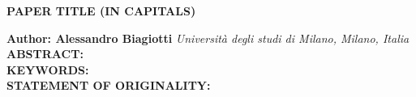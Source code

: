 \documentclass[a4paper,10pt]{article}
\begin{document}
\noindent 
\begin{center}
\textbf{{\Large PAPER TITLE (IN CAPITALS)}} \\
\end{center}

\noindent 
\textbf{Author: Alessandro Biagiotti} \textit{Università degli studi di Milano, Milano, Italia}
\\


\noindent 
\textbf{ABSTRACT:}
\\

\noindent 
\textbf{KEYWORDS:} 
\\

\noindent 
\textbf{STATEMENT OF ORIGINALITY:} 



\clearpage
\end{document}
